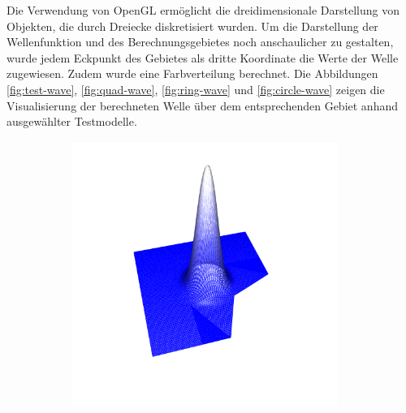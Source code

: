 \documentclass[crop=false,10pt,ngerman]{standalone}
\begin{document}
      Die Verwendung von OpenGL ermöglicht die dreidimensionale Darstellung von Objekten, die durch Dreiecke diskretisiert wurden.
      Um die Darstellung der Wellenfunktion und des Berechnungsgebietes noch anschaulicher zu gestalten, wurde jedem Eckpunkt des Gebietes als dritte Koordinate die Werte der Welle zugewiesen.
      Zudem wurde eine Farbverteilung berechnet.
      Die Abbildungen \ref{fig:test-wave}, \ref{fig:quad-wave}, \ref{fig:ring-wave} und \ref{fig:circle-wave} zeigen die Visualisierung der berechneten Welle über dem entsprechenden Gebiet anhand ausgewählter Testmodelle.

      \begin{figure}[h]
        \center
        \begin{subfigure}[b]{0.24\textwidth}
          \center
          \includegraphics[trim={4cm 1.2cm 4.5cm 1.5cm},clip,width=0.95\textwidth]{images/test_wave_0.png}
          \caption{}
        \end{subfigure}
        \begin{subfigure}[b]{0.24\textwidth}
          \center

\end{subfigure}
\end{figure}
\end{document}
